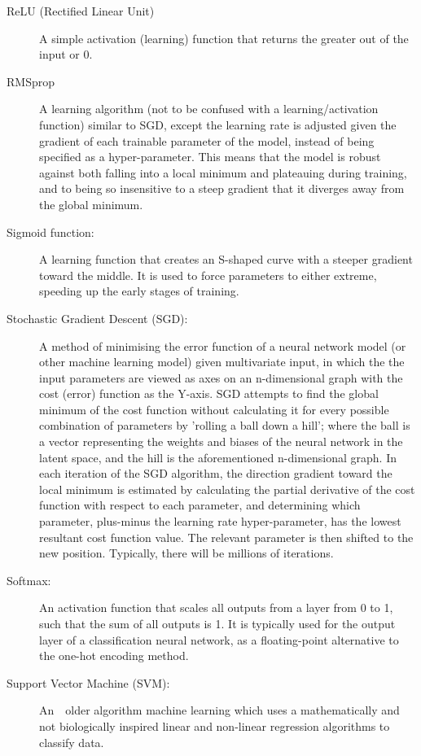 \documentclass[]{report}
\begin{document}
\begin{description}
\item[ReLU (Rectified Linear Unit)] A simple activation (learning) function that returns the greater out of the input or 0.

\item[RMSprop] A learning algorithm (not to be confused with a learning/activation function) similar to SGD, except the learning rate is adjusted given the gradient of each trainable parameter of the model, instead of being specified as a hyper-parameter. This means that the model is robust against both falling into a local minimum and plateauing during training, and to being so insensitive to a steep gradient that it diverges away from the global minimum.

\item[Sigmoid function:] A learning function that creates an S-shaped curve with a steeper gradient toward the middle. It is used to force parameters to either extreme, speeding up the early stages of training.

\label{itm:SGD}
\item[Stochastic Gradient Descent (SGD):] A method of minimising the error function of a neural network model (or other machine learning model) given multivariate input, in which the the input parameters are viewed as axes on an n-dimensional graph with the cost (error) function as the Y-axis. SGD attempts to find the global minimum of the cost function without calculating it for every possible combination of parameters by 'rolling a ball down a hill'; where the ball is a vector representing the weights and biases of the neural network in the latent space, and the hill is the aforementioned n-dimensional graph. In each iteration of the SGD algorithm, the direction gradient toward the local minimum is estimated by calculating the partial derivative of the cost function with respect to each parameter, and determining which parameter, plus-minus the learning rate hyper-parameter, has the lowest resultant cost function value. The relevant parameter is then shifted to the new position. Typically, there will be millions of iterations.

\item[Softmax:] An activation function that scales all outputs from a layer from 0 to 1, such that the sum of all outputs is 1. It is typically used for the output layer of a classification neural network, as a floating-point alternative to the one-hot encoding method.

\item[Support Vector Machine (SVM):] An　older algorithm machine learning which uses a mathematically and not biologically inspired linear and non-linear regression algorithms to classify data.
\end{description}
\onecolumn

\printbibliography
\end{document}

